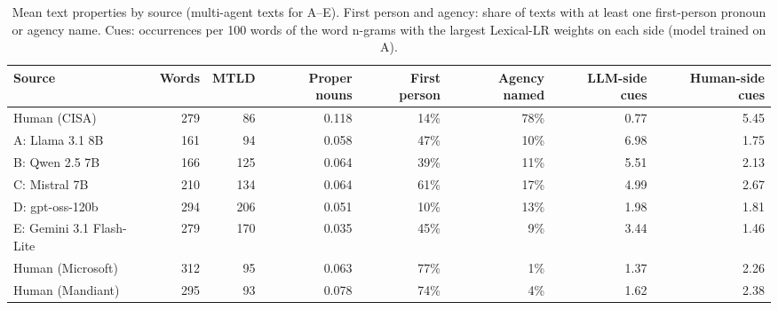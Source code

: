 \begin{table}[t]
\centering
\footnotesize
\caption{Mean text properties by source (multi-agent texts for A--E). First person and agency: share of texts with at least one first-person pronoun or agency name. Cues: occurrences per 100 words of the word n-grams with the largest Lexical-LR weights on each side (model trained on A).}
\label{tab:profile}
\begin{tabular}{lrrrrrrr}
\toprule
Source & Words & MTLD & Proper nouns & First person & Agency named & LLM-side cues & Human-side cues \\
\midrule
Human (CISA) & 279 & 86 & 0.118 & 14\% & 78\% & 0.77 & 5.45 \\
A: Llama 3.1 8B & 161 & 94 & 0.058 & 47\% & 10\% & 6.98 & 1.75 \\
B: Qwen 2.5 7B & 166 & 125 & 0.064 & 39\% & 11\% & 5.51 & 2.13 \\
C: Mistral 7B & 210 & 134 & 0.064 & 61\% & 17\% & 4.99 & 2.67 \\
D: gpt-oss-120b & 294 & 206 & 0.051 & 10\% & 13\% & 1.98 & 1.81 \\
E: Gemini 3.1 Flash-Lite & 279 & 170 & 0.035 & 45\% & 9\% & 3.44 & 1.46 \\
Human (Microsoft) & 312 & 95 & 0.063 & 77\% & 1\% & 1.37 & 2.26 \\
Human (Mandiant) & 295 & 93 & 0.078 & 74\% & 4\% & 1.62 & 2.38 \\
\bottomrule
\end{tabular}
\end{table}
